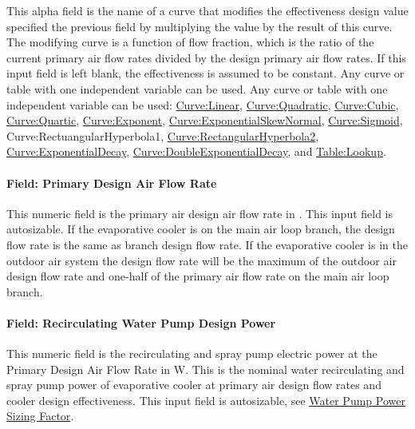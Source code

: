 This alpha field is the name of a curve that modifies the effectiveness design value specified the previous field by multiplying the value by the result of this curve. The modifying curve is a function of flow fraction, which is the ratio of the current primary air flow rates divided by the design primary air flow rates. If this input field is left blank, the effectiveness is assumed to be constant. Any curve or table with one independent variable can be used. Any curve or table with one independent variable can be used: \hyperref[curvelinear]{Curve:Linear}, \hyperref[curvequadratic]{Curve:Quadratic}, \hyperref[curvecubic]{Curve:Cubic}, \hyperref[curvequartic]{Curve:Quartic}, \hyperref[curveexponent]{Curve:Exponent}, \hyperref[curveexponentialskewnormal]{Curve:ExponentialSkewNormal}, \hyperref[curvesigmoid]{Curve:Sigmoid}, Curve:RectuangularHyperbola1, \hyperref[curverectangularhyperbola2]{Curve:RectangularHyperbola2}, \hyperref[curveexponentialdecay]{Curve:ExponentialDecay}, \hyperref[curvedoubleexponentialdecay]{Curve:DoubleExponentialDecay}, and \hyperref[tablelookup]{Table:Lookup}.

\paragraph{Field: Primary Design Air Flow Rate}\label{field-primary-design-air-flow-rate}

This numeric field is the primary air design air flow rate in \si{\volumeFlowRate}. This input field is autosizable. If the evaporative cooler is on the main air loop branch, the design flow rate is the same as branch design flow rate. If the evaporative cooler is in the outdoor air system the design flow rate will be the maximum of the outdoor air design flow rate and one-half of the primary air flow rate on the main air loop branch.

\paragraph{Field: Recirculating Water Pump Design Power}

This numeric field is the recirculating and spray pump electric power at the Primary Design Air Flow Rate in \si{\watt}.
This is the nominal water recirculating and spray pump power of evaporative cooler at primary air design flow rates and cooler design effectiveness.
This input field is autosizable, see \hyperref[field-water-pump-power-sizing-factor]{Water Pump Power Sizing Factor}.

